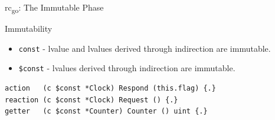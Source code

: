 \documentclass{beamer}
\newcommand{\rcgo}{rc\textsubscript{go}}
\begin{document}
\begin{frame}[fragile]{\rcgo{}:  The Immutable Phase}

  \begin{block}{Immutability}
    \begin{itemize}
      \item \verb+const+ - lvalue and lvalues derived through indirection are immutable.
      \item \verb+$const+ - lvalues derived through indirection are immutable.
    \end{itemize}
  \end{block}

\begin{lstlisting}
action   (c $const *Clock) Respond (this.flag) {.}
reaction (c $const *Clock) Request () {.}
getter   (c $const *Counter) Counter () uint {.}
\end{lstlisting}



\end{frame}
\end{document}
